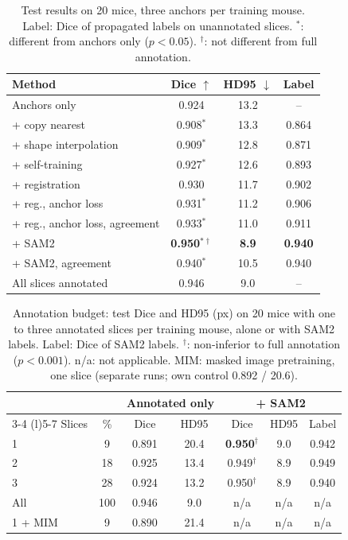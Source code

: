 \begin{table}[t]
\centering
\caption{Test results on 20 mice, three anchors per training mouse. Label: Dice of propagated labels on unannotated slices. $^{*}$: different from anchors only ($p<0.05$). $^{\dagger}$: not different from full annotation.}
\label{tab:results}
\small
\setlength{\tabcolsep}{3pt}
\begin{tabular}{@{}lccc@{}}
\toprule
Method & Dice $\uparrow$ & HD95 $\downarrow$ & Label \\
\midrule
Anchors only & 0.924 & 13.2 & -- \\
+ copy nearest & 0.908$^{*}$ & 13.3 & 0.864 \\
+ shape interpolation & 0.909$^{*}$ & 12.8 & 0.871 \\
+ self-training & 0.927$^{*}$ & 12.6 & 0.893 \\
+ registration & 0.930 & 11.7 & 0.902 \\
+ reg., anchor loss & 0.931$^{*}$ & 11.2 & 0.906 \\
+ reg., anchor loss, agreement & 0.933$^{*}$ & 11.0 & 0.911 \\
+ SAM2 & \textbf{0.950}$^{*\dagger}$ & \textbf{8.9} & \textbf{0.940} \\
+ SAM2, agreement & 0.940$^{*}$ & 10.5 & 0.940 \\
\midrule
All slices annotated & 0.946 & 9.0 & -- \\
\bottomrule
\end{tabular}
\end{table}

\begin{table}[t]
\centering
\caption{Annotation budget: test Dice and HD95 (px) on 20 mice with one to three annotated slices per training mouse, alone or with SAM2 labels. Label: Dice of SAM2 labels. $^{\dagger}$: non-inferior to full annotation ($p<0.001$). n/a: not applicable. MIM: masked image pretraining, one slice (separate runs; own control 0.892 / 20.6).}
\label{tab:budget}
\small
\setlength{\tabcolsep}{3pt}
\begin{tabular}{@{}lcccccc@{}}
\toprule
 & & \multicolumn{2}{c}{Annotated only} & \multicolumn{3}{c}{+ SAM2} \\
\cmidrule(lr){3-4} \cmidrule(l){5-7}
Slices & \% & Dice & HD95 & Dice & HD95 & Label \\
\midrule
1 & 9 & 0.891 & 20.4 & \textbf{0.950}$^{\dagger}$ & 9.0 & 0.942 \\
2 & 18 & 0.925 & 13.4 & 0.949$^{\dagger}$ & 8.9 & 0.949 \\
3 & 28 & 0.924 & 13.2 & 0.950$^{\dagger}$ & 8.9 & 0.940 \\
All & 100 & 0.946 & 9.0 & n/a & n/a & n/a \\
\midrule
1 + MIM & 9 & 0.890 & 21.4 & n/a & n/a & n/a \\
\bottomrule
\end{tabular}
\end{table}

